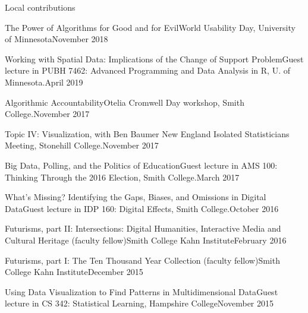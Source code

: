 \documentclass{resume} %
\begin{document}
\begin{rSection}{Local contributions}

\begin{sSubsection}{The Power of Algorithms for Good and for Evil}{}{}{World Usability Day, University of Minnesota}{November 2018}
\end{sSubsection}

\begin{sSubsection}{Working with Spatial Data: Implications of the Change of Support Problem}{}{}{Guest lecture in PUBH 7462: Advanced Programming and Data Analysis in R, U. of Minnesota.}{April 2019}
\end{sSubsection}

\begin{sSubsection}{Algorithmic Accountability}{}{}{Otelia Cromwell Day workshop, Smith College.}{November 2017}
\end{sSubsection}

\begin{sSubsection}{Topic IV: Visualization}{, with Ben Baumer }{}{New England Isolated Statisticians Meeting, Stonehill College.}{November 2017}
\end{sSubsection}

\begin{sSubsection}{Big Data, Polling, and the Politics of Education}{}{}{Guest lecture in AMS 100: Thinking Through the 2016 Election, Smith College.}{March 2017}
\end{sSubsection}

\begin{sSubsection}{What's Missing? Identifying the Gaps, Biases, and Omissions in Digital Data}{}{}{Guest lecture in IDP 160: Digital Effects, Smith College.}{October 2016}
\end{sSubsection}

\begin{sSubsection}{Futurisms, part II: Intersections: Digital Humanities, Interactive Media and Cultural Heritage}{ (faculty fellow)}{}{Smith College Kahn Institute}{February 2016}
\end{sSubsection}
\begin{sSubsection}{Futurisms, part I: The Ten Thousand Year Collection}{ (faculty fellow)}{}{Smith College Kahn Institute}{December 2015}
\end{sSubsection}

\begin{sSubsection}{Using Data Visualization to Find Patterns in Multidimensional Data}{}{}{Guest lecture in CS 342: Statistical Learning, Hampshire College}{November 2015}
\end{sSubsection}


\end{rSection}
\end{document}
